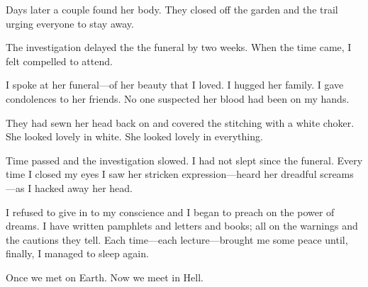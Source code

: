 \documentclass{article}
\begin{document}
\noindent
Days later a couple found her body.
They closed off the garden and the trail
urging everyone to stay away.


The investigation delayed the the funeral by two weeks.
When the time came, I felt compelled to attend.


I spoke at her funeral---of her beauty that I loved.
I hugged her family.
I gave condolences to her friends.
No one suspected her blood had been on my hands.


They had sewn her head back on and covered the
stitching with a white choker.
She looked lovely in white.
She looked lovely in everything.
\VV


\noindent
Time passed and the investigation slowed.
I had not slept since the funeral.
Every time I closed my eyes I saw her stricken expression---heard
her dreadful screams---as I hacked away her head.


I refused to give in to my conscience and I began to preach
on the power of dreams.
I have written pamphlets and letters and books;
all on the warnings and the cautions they tell.
Each time---each lecture---brought me some peace
until, finally, I managed to sleep again.
%
%
%
%
%
%
%
%
%
%
%
%
%
%
\VV

\begin{center}
Once we met on Earth.
Now we meet in Hell.
\end{center}
\end{document}
